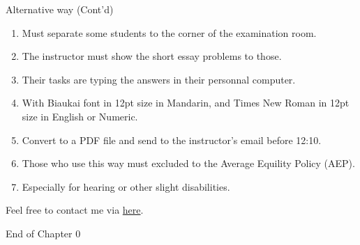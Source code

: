 \documentclass{beamer}
\begin{document}
\begin{frame}{Alternative way (Cont'd)}
\begin{enumerate}
\pause
\item Must separate some students to the corner of the examination room. \\
\pause
\item The instructor must show the short essay problems to those. \\    
\pause
\item Their tasks are typing the answers in their personnal computer. \\
\pause
\item With Biaukai font in 12pt size in Mandarin, and Times New Roman in 12pt size in English or Numeric. \\
\pause
\item Convert to a PDF file and send to the instructor's email before 12:10. \\
\pause
\item Those who use this way must excluded to the Average Equility Policy (AEP). \\
\pause
\item Especially for hearing or other slight disabilities. \\
\end{enumerate}
\end{frame}
\begin{frame}{}
\begin{center}
\Large{Feel free to contact me via \href{mailto:politics.tchsiao@gmail.com}{here}.}
\end{center}
\end{frame}
\begin{frame}{}
\begin{center}
\Large{End of Chapter 0}
\end{center}
\end{frame}
\end{document}
